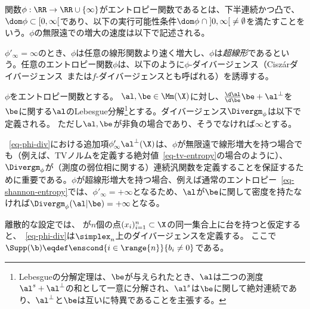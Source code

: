 \begin{defn}[エントロピー関数]
\label{def_entropy}
関数$\phi : \RR \to \RR \cup \{\infty\}$がエントロピー関数であるとは、下半連続かつ凸で、$\dom \phi\subset [0,\infty[$であり、以下の実行可能性条件$\dom \phi \; \cap\;  ]0, \infty[\; \neq \emptyset$を満たすことをいう。$\phi$の無限遠での増大の速度は以下で記述される。%
\end{defn}

$\phi'_\infty = \infty$のとき、$\phi$は任意の線形関数より速く増大し、$\phi$は\emph{超線形}であるという。任意のエントロピー関数$\phi$は、以下のように$\phi$-ダイバージェンス（Cisz\'arダイバージェンス~\citep{ciszar1967information,ali1966general}または$f$-ダイバージェンスとも呼ばれる）を誘導する。



\begin{defn}
\label{def_divergence}
$\phi$をエントロピー関数とする。
$\al,\be \in \Mm(\X)$に対し、$\frac{\d \al}{\d \be} \be + \al^{\perp}$を$\be$に関する$\al$のLebesgue分解\footnote{Lebesgueの分解定理は、$\be$が与えられたとき、$\al$は二つの測度$\al^s + \al^\perp$の和として一意に分解され、$\al^s$は$\be$に関して絶対連続であり、$\al^\perp$と$\be$は互いに特異であることを主張する。}とする。ダイバージェンス$\Divergm_\phi$は以下で定義される。
ただし$\al,\be$が非負の場合であり、そうでなければ$\infty$とする。
\end{defn}%

~\eqref{eq-phi-div}における追加項$\phi'_\infty \al^{\perp}(\X)$は、$\phi$が無限遠で線形増大を持つ場合でも（例えば、TVノルムを定義する絶対値~\eqref{eq-tv-entropy}の場合のように）、$\Divergm_\phi$が（測度の弱位相に関する）連続汎関数を定義することを保証するために重要である。$\phi$が超線形増大を持つ場合、例えば通常のエントロピー~\eqref{eq-shannon-entropy}では、$\phi'_\infty=+\infty$となるため、$\al$が$\be$に関して密度を持たなければ$\Divergm_\phi (\al|\be) = +\infty$となる。

離散的な設定では、
が$n$個の点$(x_i)_{i=1}^n \subset \X$の同一集合上に台を持つと仮定すると、~\eqref{eq-phi-div}は$\simplex_n$上のダイバージェンスを定義する。
ここで$\Supp(\b) \eqdef \enscond{i \in \range{n}}{ b_i \neq 0 }$である。

